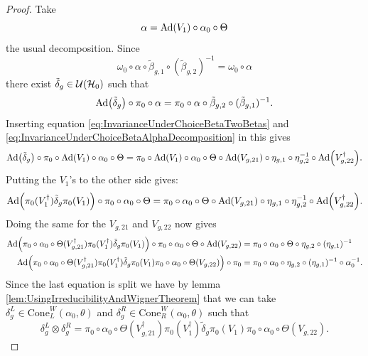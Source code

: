 \documentclass[12pt,a4paper,twoside]{article}
\numberwithin{equation}{section}
\begin{document}
\begin{proof}
	Take 
	\begin{equation}\label{eq:InvarianceUnderChoiceBetaAlphaDecomposition}
		\alpha=\Ad{V_1}\circ\alpha_{0}\circ\Theta
	\end{equation}
	the usual decomposition. Since
	\begin{equation}
		\omega_0\circ\alpha\circ\tilde{\beta}_{g,1}\circ(\tilde{\beta}_{g,2})^{-1}=\omega_0\circ\alpha
	\end{equation}
	there exist $\tilde{\delta}_g\in\mathcal U(\mathcal H_0)$ such that
	\begin{equation}
		\Ad{\tilde{\delta}_g}\circ\pi_0\circ\alpha=\pi_0\circ\alpha\circ\tilde{\beta}_{g,2}\circ(\tilde{\beta}_{g,1})^{-1}.
	\end{equation}
	Inserting equation \eqref{eq:InvarianceUnderChoiceBetaTwoBetas} and \eqref{eq:InvarianceUnderChoiceBetaAlphaDecomposition} in this gives
	\begin{equation}
		\Ad{\tilde{\delta}_g}\circ\pi_0\circ\Ad{V_1}\circ\alpha_0\circ\Theta=\pi_0\circ\Ad{V_1}\circ\alpha_0\circ\Theta\circ\Ad{V_{g,21}}\circ\eta_{g,1}\circ\eta_{g,2}^{-1}\circ\Ad{V_{g,22}^\dagger}.
	\end{equation}
	Putting the $V_1$'s to the other side gives:
	\begin{equation}
		\Ad{\pi_0(V_1^\dagger) \tilde{\delta}_g\pi_0(V_1)}\circ\pi_0\circ\alpha_0\circ\Theta=\pi_0\circ\alpha_0\circ\Theta\circ\Ad{V_{g,21}}\circ\eta_{g,1}\circ\eta_{g,2}^{-1}\circ\Ad{V_{g,22}^\dagger}.
	\end{equation}
	Doing the same for the $V_{g,21}$ and $V_{g,22}$ now gives
	\begin{align}
		\Ad{\pi_0\circ\alpha_0\circ\Theta(V_{g,21}^\dagger)\pi_0(V_1^\dagger)\tilde{\delta}_g\pi_0(V_1)}\circ\pi_0\circ\alpha_0\circ\Theta\circ\Ad{V_{g,22}}&=\pi_0\circ\alpha_0\circ\Theta\circ\eta_{g,2}\circ(\eta_{g,1})^{-1}\\
		\Ad{\pi_0\circ\alpha_0\circ\Theta(V_{g,21}^\dagger)\pi_0(V_1^\dagger)\tilde{\delta}_g\pi_0(V_1)\pi_0\circ\alpha_0\circ\Theta(V_{g,22})}\circ\pi_0&=\pi_0\circ\alpha_0\circ\eta_{g,2}\circ(\eta_{g,1})^{-1}\circ\alpha_0^{-1}.
	\end{align}
	Since the last equation is split we have by lemma \ref{lem:UsingIrreducibilityAndWignerTheorem} that we can take $\delta_g^L\in\textrm{Cone}_L^W(\alpha_0,\theta)$ and $\delta_g^R\in\textrm{Cone}_R^W(\alpha_0,\theta)$ such that
	\begin{equation}
		\delta_g^L\otimes\delta_g^R=\pi_0\circ\alpha_0\circ\Theta(V_{g,21}^\dagger)\pi_0(V_1^\dagger)\tilde{\delta}_g\pi_0(V_1)\pi_0\circ\alpha_0\circ\Theta(V_{g,22}).

\end{equation}
\end{proof}
\end{document}
